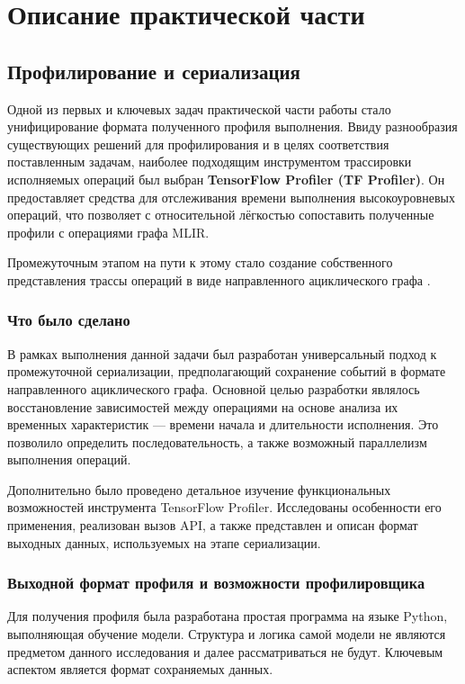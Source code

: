 \section{Описание практической части}
\label{sec:Chapter3} 

\subsection{Профилирование и сериализация}

Одной из первых и ключевых задач практической части работы стало унифицирование формата полученного профиля выполнения.
Ввиду разнообразия существующих решений для профилирования и в целях соответствия поставленным задачам, наиболее подходящим инструментом трассировки исполняемых операций был выбран \textbf{TensorFlow Profiler (TF Profiler)}.
Он предоставляет средства для отслеживания времени выполнения высокоуровневых операций, что позволяет с относительной лёгкостью сопоставить полученные профили с операциями графа MLIR.

Промежуточным этапом на пути к этому стало создание собственного представления трассы операций в виде направленного ациклического графа .

\subsubsection{Что было сделано}
В рамках выполнения данной задачи был разработан универсальный подход к промежуточной сериализации, предполагающий сохранение событий в формате направленного ациклического графа.
Основной целью разработки являлось восстановление зависимостей между операциями на основе анализа их временных характеристик — времени начала и длительности исполнения.
Это позволило определить последовательность, а также возможный параллелизм выполнения операций.

Дополнительно было проведено детальное изучение функциональных возможностей инструмента TensorFlow Profiler.
Исследованы особенности его применения, реализован вызов API, а также представлен и описан формат выходных данных, используемых на этапе сериализации.

\subsubsection{Выходной формат профиля и возможности профилировщика}

Для получения профиля была разработана простая программа на языке Python, выполняющая обучение модели.
Структура и логика самой модели не являются предметом данного исследования и далее рассматриваться не будут.
Ключевым аспектом является формат сохраняемых данных.


